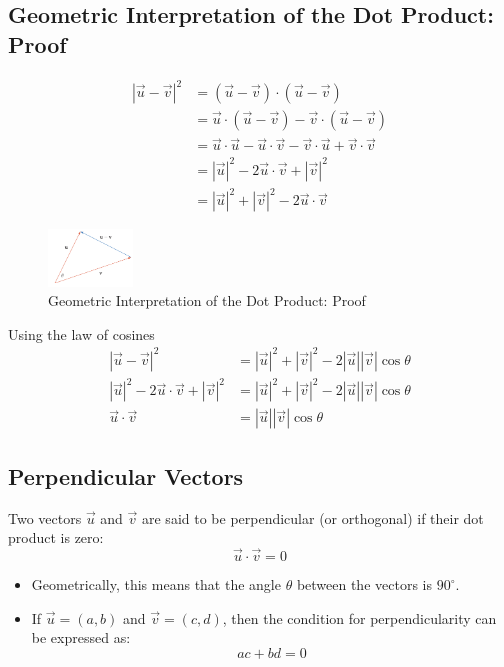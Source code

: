 \subsection{Geometric Interpretation of the Dot Product: Proof}
\begin{align*}
    | \vec{u} - \vec{v}|^2 &= (\vec{u} - \vec{v}) \cdot (\vec{u} - \vec{v}) \\
    &= \vec{u} \cdot (\vec{u} - \vec{v} ) - \vec{v} \cdot (\vec{u} - \vec{v}) \\
    &= \vec{u} \cdot \vec{u} - \vec{u} \cdot \vec{v} - \vec{v} \cdot \vec{u} + \vec{v} \cdot \vec{v} \\
    &= |\vec{u}|^2 - 2\vec{u} \cdot \vec{v} + |\vec{v}|^2 \\
    &= |\vec{u}|^2 + |\vec{v}|^2 - 2\vec{u} \cdot \vec{v}
\end{align*}
\begin{figure}
    \centering
    \includegraphics[width=0.2\textwidth]{pics/vector6.png}
    \caption{Geometric Interpretation of the Dot Product: Proof}
    \label{fig:dot_product_proof}
\end{figure}
Using the law of cosines
\begin{align*}
    |\vec{u} - \vec{v}|^2 &= |\vec{u}|^2 + |\vec{v}|^2 - 2|\vec{u}||\vec{v}|\cos\theta \\
    |\vec{u}|^2 - 2\vec{u} \cdot \vec{v} + |\vec{v}|^2 &= |\vec{u}|^2 + |\vec{v}|^2 - 2|\vec{u}||\vec{v}|\cos\theta \\
    \vec{u} \cdot \vec{v} &= |\vec{u}||\vec{v}|\cos\theta
\end{align*}

\subsection{Perpendicular Vectors}
Two vectors \(\vec{u}\) and \(\vec{v}\) are said to be perpendicular (or orthogonal) if their dot product is zero:
\[ \vec{u} \cdot \vec{v} = 0 \]
\begin{itemize}
    \item Geometrically, this means that the angle \(\theta\) between the vectors is \(90^\circ\).
    \item If \(\vec{u} = (a, b)\) and \(\vec{v} = (c, d)\), then the condition for perpendicularity can be expressed as:
    \[ ac + bd = 0 \]
\end{itemize}

